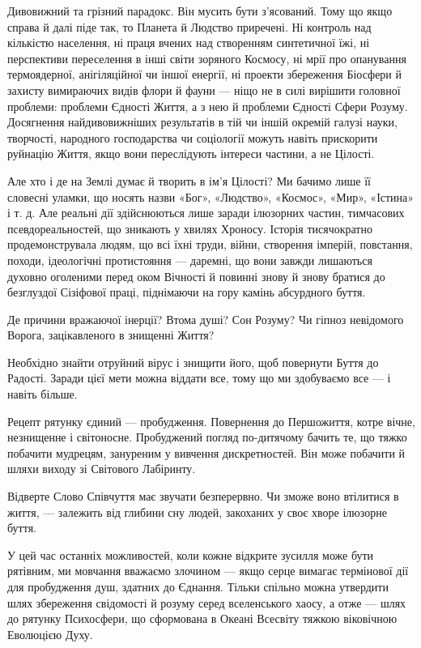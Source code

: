Дивовижний та грізний парадокс. Він мусить бути з’ясований. Тому що якщо справа
й далі піде так, то Планета й Людство приречені. Ні контроль над кількістю
населення, ні праця вчених над створенням синтетичної їжі, ні перспективи
переселення в інші світи зоряного Космосу, ні мрії про опанування термоядерної,
анігіляційної чи іншої енергії, ні проекти збереження Біосфери й захисту
вимираючих видів флори й фауни — ніщо не в силі вирішити головної проблеми:
проблеми Єдності Життя, а з нею й проблеми Єдності Сфери Розуму. Досягнення
найдивовижніших результатів в тій чи іншій окремій галузі науки, творчості,
народного господарства чи соціології можуть навіть прискорити руйнацію Життя,
якщо вони переслідують інтереси частини, а не Цілості.

Але хто і де на Землі думає й творить в ім’я Цілості? Ми бачимо лише її
словесні уламки, що носять назви «Бог», «Людство», «Космос», «Мир», «Істина» і
т. д. Але реальні дії здійснюються лише заради ілюзорних частин, тимчасових
псевдореальностей, що зникають у хвилях Хроносу. Історія тисячократно
продемонструвала людям, що всі їхні труди, війни, створення імперій, повстання,
походи, ідеологічні протистояння — даремні, що вони завжди лишаються духовно
оголеними перед оком Вічності й повинні знову й знову братися до безглуздої
Сізіфової праці, піднімаючи на гору камінь абсурдного буття.

Де причини вражаючої інерції? Втома душі? Сон Розуму? Чи гіпноз невідомого
Ворога, зацікавленого в знищенні Життя?

Необхідно знайти отруйний вірус і знищити його, щоб повернути Буття до Радості.
Заради цієї мети можна віддати все, тому що ми здобуваємо все — і навіть
більше.

Рецепт рятунку єдиний — пробудження. Повернення до Першожиття, котре вічне,
незнищенне і світоносне. Пробуджений погляд по-дитячому бачить те, що тяжко
побачити мудрецям, зануреним у вивчення дискретностей. Він може побачити й
шляхи виходу зі Світового Лабіринту.

Відверте Слово Співчуття має звучати безперервно. Чи зможе воно втілитися в
життя, — залежить від глибини сну людей, закоханих у своє хворе ілюзорне буття.

У цей час останніх можливостей, коли кожне відкрите зусилля може бути рятівним,
ми мовчання вважаємо злочином — якщо серце вимагає термінової дії для
пробудження душ, здатних до Єднання. Тільки спільно можна утвердити шлях
збереження свідомості й розуму серед вселенського хаосу, а отже — шлях до
рятунку Психосфери, що сформована в Океані Всесвіту тяжкою віковічною Еволюцією
Духу.

